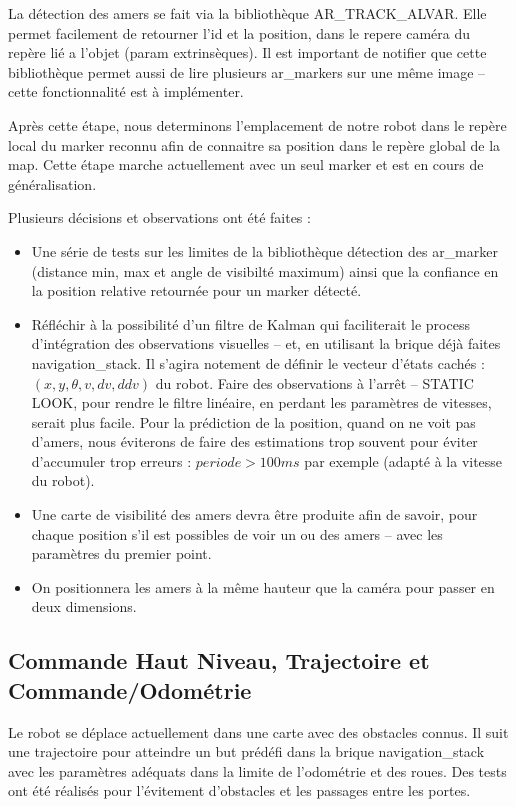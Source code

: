 \documentclass[a4wide,10pt]{article}
\begin{document}
La détection des amers se fait via la bibliothèque AR\_TRACK\_ALVAR.
Elle permet facilement de retourner l'id et la position, dans le repere caméra du repère lié a l'objet (param extrinsèques). 
Il est important de notifier que cette bibliothèque permet aussi de lire plusieurs ar\_markers sur une même image -- cette fonctionnalité est à implémenter. 

Après cette étape, nous determinons l'emplacement de notre robot dans le repère local du  marker reconnu afin de connaitre sa position dans le repère global de la map. Cette étape marche actuellement avec un seul marker et est en cours de généralisation. 

Plusieurs décisions et observations ont été faites :

\begin{itemize}
\item Une série de tests sur les limites de la bibliothèque détection des ar\_marker (distance min, max et angle de visibilté maximum) ainsi que la confiance en la position relative retournée pour un marker détecté.
\item Réfléchir à la possibilité d'un filtre de Kalman qui faciliterait le process d'intégration des observations visuelles -- et, en utilisant la brique déjà faites navigation\_stack. 
Il s'agira notement de définir le vecteur d'états cachés : $(x, y, \theta, v, dv, ddv)$ du robot. 
Faire des observations à l'arrêt -- STATIC LOOK, pour rendre le filtre linéaire, en perdant les paramètres de vitesses, serait plus facile.
Pour la prédiction de la position, quand on ne voit pas d'amers, nous éviterons de faire des estimations trop souvent pour éviter d'accumuler trop erreurs : $periode > 100 ms$ par exemple (adapté à la vitesse du robot).  
\item Une carte de visibilité des amers devra être produite afin de savoir, pour chaque position s'il est possibles de voir un ou des amers -- avec les paramètres du premier point. 
\item On positionnera les amers à la même hauteur que la caméra pour passer en deux dimensions. 
\end{itemize}


\subsection*{Commande Haut Niveau, Trajectoire et Commande/Odométrie}

Le robot se déplace actuellement dans une carte avec des obstacles connus. Il suit une trajectoire pour atteindre un but prédéfi dans la brique navigation\_stack avec les paramètres adéquats dans la limite de l'odométrie et des roues. 
Des tests ont été réalisés pour l'évitement d'obstacles et les passages entre les portes. 
\end{document}
